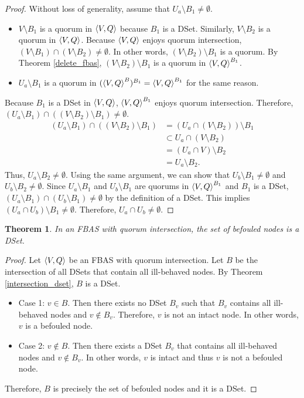 \documentclass[12pt, psamsfonts]{amsart}
\newtheorem{thm}{Theorem}[section]
\theoremstyle{definition}
\theoremstyle{remark}
\numberwithin{equation}{section}
\begin{document}
\begin{proof}
	Without loss of generality, assume that $U_a \setminus B_1 \ne \emptyset$.
	\begin{itemize}
		\item
			$V \setminus B_1$ is a quorum in $\ev{V, Q}$ because $B_1$ is a DSet.
			Similarly, $V \setminus B_2$ is a quorum in $\ev{V, Q}$.
			Because $\ev{V, Q}$ enjoys quorum intersection, $(V \setminus B_1) \cap (V \setminus B_2) \ne \emptyset$.
			In other words, $(V \setminus B_2) \setminus B_1$ is a quorum.
			By Theorem \ref{delete_fbas}, $(V \setminus B_2) \setminus B_1$ is a quorum in $\ev{V, Q}^{B_1}$.
		\item
			$U_a \setminus B_1$ is a quorum in $(\ev{V, Q}^B)^{B_1} = \ev{V, Q}^{B_1}$ for the same reason.
	\end{itemize}
	Because $B_1$ is a DSet in $\ev{V, Q}$, $\ev{V, Q}^{B_1}$ enjoys quorum intersection.
	Therefore, $(U_a \setminus B_1) \cap ((V \setminus B_2) \setminus B_1) \ne \emptyset$.
	\begin{align*}
	  (U_a \setminus B_1) \cap ((V \setminus B_2) \setminus B_1)
		&= (U_a \cap (V \setminus B_2)) \setminus B_1 \\
		&\subset U_a \cap (V \setminus B_2) \\
		&= (U_a \cap V) \setminus B_2 \\
		&= U_a \setminus B_2.
	\end{align*}
	Thus, $U_a \setminus B_2 \ne \emptyset$.
	Using the same argument, we can show that $U_b \setminus B_1 \ne \emptyset$ and $U_b \setminus B_2 \ne \emptyset$.
	Since $U_a \setminus B_1$ and $U_b \setminus B_1$ are quorums in $\ev{V, Q}^{B_1}$ and $B_1$ is a DSet, $(U_a \setminus B_1) \cap (U_b \setminus B_1) \ne \emptyset$ by the definition of a DSet.
	This implies $(U_a \cap U_b) \setminus B_1 \ne \emptyset$.
	Therefore, $U_a \cap U_b \ne \emptyset$.
\end{proof}

\begin{thm}\label{befouled_dset}
	In an FBAS with quorum intersection, the set of befouled nodes is a DSet.
\end{thm}

\begin{proof}
	Let $\ev{V, Q}$ be an FBAS with quorum intersection.
	Let $B$ be the intersection of all DSets that contain all ill-behaved nodes.
	By Theorem \ref{intersection_dset}, $B$ is a DSet.

	\begin{itemize}
		\item
			Case 1: $v \in B$.
			Then there exists no DSet $B_v$ such that $B_v$ contains all ill-behaved nodes and $v \notin B_v$.
			Therefore, $v$ is not an intact node.
			In other words, $v$ is a befouled node.
		\item
			Case 2: $v \notin B$.
			Then there exists a DSet $B_v$ that contains all ill-behaved nodes and $v \notin B_v$.
			In other words, $v$ is intact and thus $v$ is not a befouled node.
	\end{itemize}

	Therefore, $B$ is precisely the set of befouled nodes and it is a DSet.
\end{proof}
\end{document}
